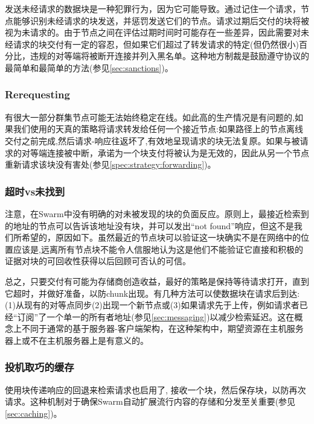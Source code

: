 发送未经请求的数据块是一种犯罪行为，因为它可能导致。通过记住一个请求，节点能够识别未经请求的块发送，并惩罚发送它们的节点。请求过期后交付的块将被视为未请求的。由于节点之间在评估过期时间时可能存在一些差异，因此需要对未经请求的块交付有一定的容忍，但如果它们超过了转发请求的特定(但仍然很小)百分比，违规的对等端将被断开连接并列入黑名单。这种地方制裁是鼓励遵守协议的最简单和最简单的方法(参见\ref{sec:sanctions})。 

\subsubsection{Rerequesting}

有很大一部分群集节点可能无法始终稳定在线。如此高的生产情况是有问题的,如果我们使用的天真的策略将请求转发给任何一个接近节点:如果路径上的节点离线交付之前完成,然后请求-响应往返坏了,有效地呈现请求的块无法复原。如果与被请求的对等端连接被中断，承诺为一个块支付将被认为是无效的，因此从另一个节点重新请求该块没有害处(参见\ref{spec:strategy:forwarding})。


\subsubsection{超时vs未找到}

注意，在Swarm中没有明确的对未被发现的块的负面反应。原则上，最接近检索到的地址的节点可以告诉该地址没有块，并可以发出“not found”响应，但这不是我们所希望的，原因如下。虽然最近的节点块可以验证这一块确实不是在网络中的位置应该是,远离所有节点块不能令人信服地认为这是他们不能验证它直接和积极的证据对块的可回收性获得以后回顾可否认的可信。 

总之，只要交付有可能为存储商创造收益，最好的策略是保持等待请求打开，直到它超时，并做好准备，以防chunk出现。有几种方法可以使数据块在请求后到达:(1)从现有的对等点同步(2)出现一个新节点或(3)如果请求先于上传，例如请求者已经“订阅”了一个单一的所有者地址(参见\ref{sec:messaging})以减少检索延迟。这在概念上不同于通常的基于服务器-客户端架构，在这种架构中，期望资源在主机服务器上或不在主机服务器上是有意义的。 
 

\subsubsection{投机取巧的缓存}

使用块传递响应的回退来检索请求也启用了, 接收一个块，然后保存块，以防再次请求。这种机制对于确保Swarm自动扩展流行内容的存储和分发至关重要(参见\ref{sec:caching})。

